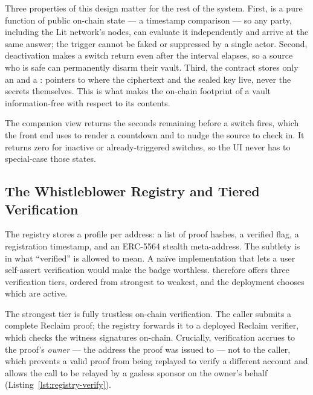 Three properties of this design matter for the rest of the system. First,
\isdeceased is a pure function of public on-chain state --- a timestamp comparison ---
so any party, including the Lit network's nodes, can evaluate it independently and
arrive at the same answer; the trigger cannot be faked or suppressed by a single
actor. Second, deactivation makes a switch return  even after the
interval elapses, so a source who is safe can permanently disarm their vault.
Third, the contract stores only an  and a
: pointers to where the ciphertext and the sealed key
live, never the secrets themselves. This is what makes the on-chain footprint of a
vault information-free with respect to its contents.

The companion view  returns the seconds remaining before a
switch fires, which the front end uses to render a countdown and to nudge the
source to check in. It returns zero for inactive or already-triggered switches, so
the UI never has to special-case those states.

\subsection{The Whistleblower Registry and Tiered Verification}
\label{sec:impl-registry}

The registry stores a profile per address: a list of proof hashes, a verified
flag, a registration timestamp, and an ERC-5564 stealth meta-address. The subtlety
is in what ``verified'' is allowed to mean. A na\"ive implementation that lets a
user self-assert verification would make the badge worthless. \zkw therefore
offers three verification tiers, ordered from strongest to weakest, and the
deployment chooses which are active.

The strongest tier is fully trustless on-chain verification. The caller submits a
complete Reclaim proof; the registry forwards it to a deployed Reclaim verifier,
which checks the witness signatures on-chain. Crucially, verification accrues to
the proof's \emph{owner} --- the address the proof was issued to --- not to the caller,
which prevents a valid proof from being replayed to verify a different account and
allows the call to be relayed by a gasless sponsor on the owner's behalf
(Listing~\ref{lst:registry-verify}).

